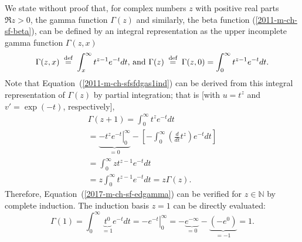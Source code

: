 We state without proof that, for complex numbers $z$
with positive real parts $\Re z >0 $, the gamma function $\Gamma (z)$ and similarly,
the
beta function
(\ref{2011-m-ch-sf-beta}),
can be defined by an integral
representation as the upper incomplete gamma function $\Gamma ( z, x )$
\begin{equation}
\begin{split}
\Gamma ( z ,x )
\stackrel{{\tiny \textrm{ def }}}{=}
\int_x^\infty t^{z-1}e^{-t}dt \text{, and }
\Gamma ( z )  \stackrel{{\tiny \textrm{ def }}}{=}  \Gamma ( z ,0 )  =
\int_0^\infty t^{z-1}e^{-t}dt
\label{2017-m-ch-sf-edgamma}
.
\end{split}
\end{equation}
{\color{OliveGreen}
\bproof
Note that Equation~(\ref{2011-m-ch-sfsfdgas1ind}) can be derived from this integral representation
of $\Gamma(z)$
by partial integration; that is [with $u=t^z$ and $v'=\exp (-t)$, respectively],
\begin{equation}
\begin{split}
\Gamma ( z+1 )
=
\int_0^\infty t^{z}e^{-t}dt
\\
=
\underbrace{\left. -t^{z}e^{-t}  \right|_0^\infty }_{=0}
-  \left[- \int_0^\infty \left( \frac{d }{dt}t^{z}\right) e^{-t} dt \right]
\\
=
\int_0^\infty z t^{z-1} e^{-t} dt
\\
=
z\int_0^\infty  t^{z-1} e^{-t} dt = z \Gamma ( z )
.
\end{split}
\end{equation}
Therefore, Equation~(\ref{2017-m-ch-sf-edgamma})
can be verified for $z\in \mathbb{N}$ by complete induction. The induction basis
$z=1$  can be directly evaluated:
\begin{equation}
\Gamma ( 1 )
=
\int_0^\infty \underbrace{t^{0}}_{=1} e^{-t}dt = \left. - e^{-t} \right|_0^\infty
= - \underbrace{e^{-\infty}}_{=0} - \underbrace{(- e^{0})}_{=-1} =1.
\end{equation}
\eproof
}

